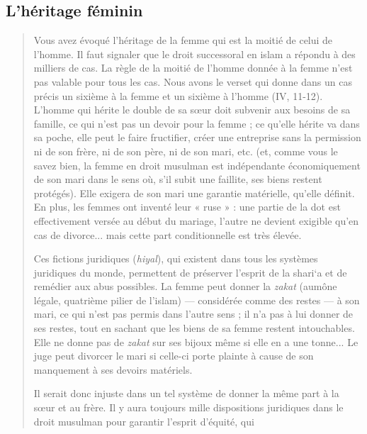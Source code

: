 \hypertarget{lhuxe9ritage-fuxe9minin}{%
\subsection{L'héritage féminin}\label{lhuxe9ritage-fuxe9minin}}

\begin{quote}
Vous avez évoqué l'héritage de la femme qui est la moitié de celui de
l'homme. Il faut signaler que le droit successoral en islam a répondu à
des milliers de cas. La règle de la moitié de l'homme donnée à la femme
n'est pas valable pour tous les cas. Nous avons le verset qui donne dans
un cas précis un sixième à la femme et un sixième à l'homme (IV, 11-12).
L'homme qui hérite le double de sa sœur doit subvenir aux besoins de sa
famille, ce qui n'est pas un devoir pour la femme ; ce qu'elle hérite va
dans sa poche, elle peut le faire fructifier, créer une entreprise sans
la permission ni de son frère, ni de son père, ni de son mari, etc. (et,
comme vous le savez bien, la femme en droit musulman est indépendante
économiquement de son mari dans le sens où, s'il subit une faillite, ses
biens restent protégés). Elle exigera de son mari une garantie
matérielle, qu'elle définit. En plus, les femmes ont inventé leur « ruse
» : une partie de la dot est effectivement versée au début du mariage,
l'autre ne devient exigible qu'en cas de divorce... mais cette part
conditionnelle est très élevée.

Ces fictions juridiques (\emph{hiyal}), qui existent dans tous les
systèmes juridiques du monde, permettent de préserver l'esprit de la
shari`a et de remédier aux abus possibles. La femme peut donner la
\emph{zakat} (aumône légale, quatrième pilier de l'islam) --- considérée
comme des restes --- à son mari, ce qui n'est pas permis dans l'autre
sens ; il n'a pas à lui donner de ses restes, tout en sachant que les
biens de sa femme restent intouchables. Elle ne donne pas de
\emph{zakat} sur ses bijoux même si elle en a une tonne... Le juge peut
divorcer le mari si celle-ci porte plainte à cause de son manquement à
ses devoirs matériels.

Il serait donc injuste dans un tel système de donner la même part à la
sœur et au frère. Il y aura toujours mille dispositions juridiques dans
le droit musulman pour garantir l'esprit d'équité, qui


\end{quote}
